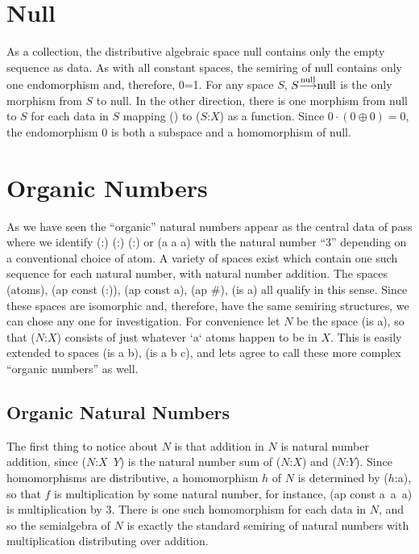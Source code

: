\documentclass[11pt]{article}
\begin{document}
\section{Null}

    As a collection, the distributive algebraic space null contains only the empty sequence as data.  As with all constant spaces, the semiring 
of null contains only one endomorphism and, therefore, 0=1.  For any space $S$, $S{\overset {\rm null}\longrightarrow}{\rm null}$ is the only morphism from 
$S$ to null.  In the other direction, there is one morphism from null to $S$ for each data in $S$ mapping () to ($S$:$X$) as a function.  
Since $0\cdot(0\oplus 0)=0$, the endomorphism $0$ is both a subspace and a homomorphism of null.  

\section{Organic Numbers}

      As we have seen the ``organic'' natural numbers appear as the central data of pass where we identify (:) (:) (:) or (a a a) with the natural number ``3'' 
 depending on a conventional choice of atom.  A variety of spaces exist which contain one such sequence for each natural number, with natural 
 number addition.  The spaces (atoms), (ap const (:)), (ap const a), (ap {\#}), (is a) all qualify in this sense.  Since these spaces are isomorphic and, therefore, 
 have the same semiring structures, we can chose any one for investigation.  For convenience let $N$ be the space (is a), so that ($N$:$X$) consists of 
 just whatever `a` atoms happen to be in $X$.  This is easily extended to spaces (is a b), (is a b c), and lets agree to call these more complex ``organic numbers'' as well. 
     
\subsection{Organic Natural Numbers}     
     
     The first thing to notice about $N$ is that addition in $N$ is natural number addition, since ($N$:$X$\ $Y$) is the natural number sum of ($N$:$X$) and ($N$:$Y$).  
Since homomorphisms are distributive, a homomorphism $h$ of $N$ is determined by ($h$:a), so that $f$ is multiplication by some natural number, 
for instance, (ap const a\ a\ a) is multiplication by $3$.  There is one such homomorphism for each data in $N$, and so the semialgebra of $N$ 
is exactly the standard semiring of natural numbers with multiplication distributing over addition.  
     
\end{document}
